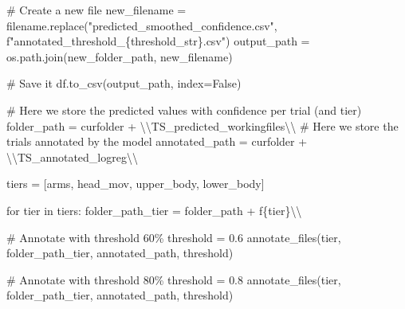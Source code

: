 \documentclass[
  letterpaper,
  DIV=11,
  numbers=noendperiod]{scrreprt}
\newenvironment{Shaded}{\begin{snugshade}}{\end{snugshade}}
\newcommand{\CharTok}[1]{\textcolor[rgb]{0.13,0.47,0.30}{#1}}
\newcommand{\CommentTok}[1]{\textcolor[rgb]{0.37,0.37,0.37}{#1}}
\newcommand{\ControlFlowTok}[1]{\textcolor[rgb]{0.00,0.23,0.31}{#1}}
\newcommand{\FloatTok}[1]{\textcolor[rgb]{0.68,0.00,0.00}{#1}}
\newcommand{\KeywordTok}[1]{\textcolor[rgb]{0.00,0.23,0.31}{#1}}
\newcommand{\NormalTok}[1]{\textcolor[rgb]{0.00,0.23,0.31}{#1}}
\newcommand{\OperatorTok}[1]{\textcolor[rgb]{0.37,0.37,0.37}{#1}}
\newcommand{\SpecialCharTok}[1]{\textcolor[rgb]{0.37,0.37,0.37}{#1}}
\newcommand{\SpecialStringTok}[1]{\textcolor[rgb]{0.13,0.47,0.30}{#1}}
\newcommand{\StringTok}[1]{\textcolor[rgb]{0.13,0.47,0.30}{#1}}
\newcommand{\VariableTok}[1]{\textcolor[rgb]{0.07,0.07,0.07}{#1}}
\begin{document}
\begin{Shaded}
\begin{Highlighting}[]
            \CommentTok{\# Create a new file}
\NormalTok{            new\_filename }\OperatorTok{=}\NormalTok{ filename.replace(}\StringTok{"predicted\_smoothed\_confidence.csv"}\NormalTok{, }\SpecialStringTok{f"annotated\_threshold\_}\SpecialCharTok{\{}\NormalTok{threshold\_str}\SpecialCharTok{\}}\SpecialStringTok{.csv"}\NormalTok{)}
\NormalTok{            output\_path }\OperatorTok{=}\NormalTok{ os.path.join(new\_folder\_path, new\_filename)}
            
            \CommentTok{\# Save it}
\NormalTok{            df.to\_csv(output\_path, index}\OperatorTok{=}\VariableTok{False}\NormalTok{)}
\end{Highlighting}
\end{Shaded}

\begin{Shaded}
\begin{Highlighting}[]
\CommentTok{\# Here we store the predicted values with confidence per trial (and tier)}
\NormalTok{folder\_path }\OperatorTok{=}\NormalTok{ curfolder }\OperatorTok{+} \StringTok{\textquotesingle{}}\CharTok{\textbackslash{}\textbackslash{}}\StringTok{TS\_predicted\_workingfiles}\CharTok{\textbackslash{}\textbackslash{}}\StringTok{\textquotesingle{}}
\CommentTok{\# Here we store the trials annotated by the model}
\NormalTok{annotated\_path }\OperatorTok{=}\NormalTok{ curfolder }\OperatorTok{+} \StringTok{\textquotesingle{}}\CharTok{\textbackslash{}\textbackslash{}}\StringTok{TS\_annotated\_logreg}\CharTok{\textbackslash{}\textbackslash{}}\StringTok{\textquotesingle{}}

\NormalTok{tiers }\OperatorTok{=}\NormalTok{ [}\StringTok{\textquotesingle{}arms\textquotesingle{}}\NormalTok{, }\StringTok{\textquotesingle{}head\_mov\textquotesingle{}}\NormalTok{, }\StringTok{\textquotesingle{}upper\_body\textquotesingle{}}\NormalTok{, }\StringTok{\textquotesingle{}lower\_body\textquotesingle{}}\NormalTok{]}

\ControlFlowTok{for}\NormalTok{ tier }\KeywordTok{in}\NormalTok{ tiers:}
\NormalTok{    folder\_path\_tier }\OperatorTok{=}\NormalTok{ folder\_path }\OperatorTok{+} \SpecialStringTok{f\textquotesingle{}}\SpecialCharTok{\{}\NormalTok{tier}\SpecialCharTok{\}}\CharTok{\textbackslash{}\textbackslash{}}\SpecialStringTok{\textquotesingle{}}

    \CommentTok{\# Annotate with threshold 60\%}
\NormalTok{    threshold }\OperatorTok{=} \FloatTok{0.6}
\NormalTok{    annotate\_files(tier, folder\_path\_tier, annotated\_path, threshold)}

    \CommentTok{\# Annotate with threshold 80\%}
\NormalTok{    threshold }\OperatorTok{=} \FloatTok{0.8}
\NormalTok{    annotate\_files(tier, folder\_path\_tier, annotated\_path, threshold)}
\end{Highlighting}
\end{Shaded}
\end{document}
